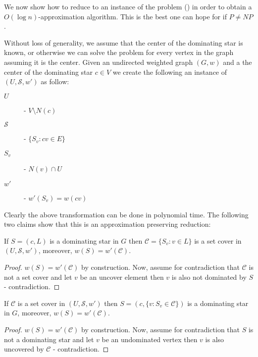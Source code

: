 We now show how to reduce \ProbStar{} to an instance of the \ProblemSetCover{} problem
(\ProbSetCover{}) in order to obtain a $O(\log n)$-approximation algorithm.
This is the best one can hope for if $P \neq NP$.

Without loss of generality, we assume that the center of the dominating star is known,
or otherwise we can solve the problem for every vertex in the graph assuming it is 
the center.  
Given an undirected weighted graph $(G, w)$ and a the center of the dominating star
$c \in V$ we create the following an instance of \ProbSetCover{} 
$(U, \mathcal{S}, w')$ as follow:
\begin{description}
\item[$U$] - $V \setminus N(c)$
\item[$\mathcal{S}$] - $\{S_v : cv \in E\}$
\item[$S_v$] - $N(v) \cap U$
\item[$w'$] - $w'(S_v) = w(cv)$ 
\end{description}
Clearly the above transformation can be done in polynomial time.
The following two claims show that this is an approximation preserving reduction:

\begin{claim}
If $S = (c, L)$ is a dominating star in $G$ then 
$\mathcal{C} = \{S_v : v \in L\}$ is a set cover in $(U, \mathcal{S}, w')$,
moreover, $w(S) = w'(\mathcal{C})$.  
\end{claim}

\begin{proof}
$w(S) = w'(\mathcal{C})$ by construction.
Now, assume for contradiction that $\mathcal{C}$ is not a set cover and let $v$
be an uncover element then $v$ is also not dominated by $S$ - contradiction.
\end{proof}

\begin{claim}
If $\mathcal{C}$ is a set cover in $(U, \mathcal{S}, w')$ 
then $S = (c, \{v : S_v \in \mathcal{C}\})$ is a dominating star in $G$,
moreover, $w(S) = w'(\mathcal{C})$.  
\end{claim}

\begin{proof}
$w(S) = w'(\mathcal{C})$ by construction.
Now, assume for contradiction that $S$ is not a dominating star and let $v$
be an undominated vertex then $v$ is also uncovered by $\mathcal{C}$ - contradiction.
\end{proof}